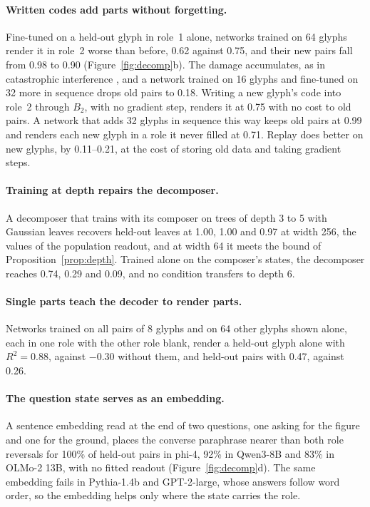 \documentclass[10pt]{article}
\theoremstyle{plain}
\theoremstyle{remark}
\begin{document}
\paragraph{Written codes add parts without forgetting.} Fine-tuned on a held-out glyph in role~1 alone, networks trained on 64 glyphs render it in role~2 worse than before, 0.62 against 0.75, and their new pairs fall from 0.98 to 0.90 (Figure~\ref{fig:decomp}b). The damage accumulates, as in catastrophic interference \citep{mccloskey1989}, and a network trained on 16 glyphs and fine-tuned on 32 more in sequence drops old pairs to 0.18. Writing a new glyph's code into role~2 through $B_2$, with no gradient step, renders it at 0.75 with no cost to old pairs. A network that adds 32 glyphs in sequence this way keeps old pairs at 0.99 and renders each new glyph in a role it never filled at 0.71. Replay does better on new glyphs, by 0.11--0.21, at the cost of storing old data and taking gradient steps.

\paragraph{Training at depth repairs the decomposer.} A decomposer that trains with its composer on trees of depth 3 to 5 with Gaussian leaves recovers held-out leaves at 1.00, 1.00 and 0.97 at width 256, the values of the population readout, and at width 64 it meets the bound of Proposition~\ref{prop:depth}. Trained alone on the composer's states, the decomposer reaches 0.74, 0.29 and 0.09, and no condition transfers to depth 6.

\paragraph{Single parts teach the decoder to render parts.} Networks trained on all pairs of 8 glyphs and on 64 other glyphs shown alone, each in one role with the other role blank, render a held-out glyph alone with $R^2 = 0.88$, against $-0.30$ without them, and held-out pairs with 0.47, against 0.26.

\paragraph{The question state serves as an embedding.} A sentence embedding read at the end of two questions, one asking for the figure and one for the ground, places the converse paraphrase nearer than both role reversals for 100\% of held-out pairs in phi-4, 92\% in Qwen3-8B and 83\% in OLMo-2 13B, with no fitted readout (Figure~\ref{fig:decomp}d). The same embedding fails in Pythia-1.4b and GPT-2-large, whose answers follow word order, so the embedding helps only where the state carries the role.
\end{document}
